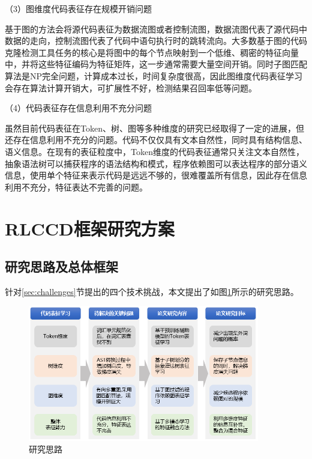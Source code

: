 （3）图维度代码表征存在规模开销问题

基于图的方法会将源代码表征为数据流图或者控制流图，数据流图代表了源代码中数据的走向，控制流图代表了代码中语句执行时的跳转流向。大多数基于图的代码克隆检测工具任务的核心是将图中的每个节点映射到一个低维、稠密的特征向量中，并将这些特征编码为特征矩阵，这一步通常需要大量空间开销。同时子图匹配算法是NP完全问题，计算成本过长，时间复杂度很高，因此图维度代码表征学习会存在算法计算开销大，可扩展性不好，检测结果召回率低等问题。

（4）代码表征存在信息利用不充分问题

虽然目前代码表征在Token、树、图等多种维度的研究已经取得了一定的进展，但还存在信息利用不充分的问题。代码不仅仅具有文本自然性，同时具有结构信息、语义信息。在现有的表征粒度中，Token维度的代码表征通常只关注文本自然性，抽象语法树可以捕获程序的语法结构和模式，程序依赖图可以表达程序的部分语义信息，使用单个特征来表示代码是远远不够的，很难覆盖所有信息，因此存在信息利用不充分，特征表达不完善的问题。

\section{RLCCD框架研究方案}
\label{sec:Framework}

\subsection{研究思路及总体框架}
\label{subsec:Ideas}
针对\ref{sec:challenges}节提出的四个技术挑战，本文提出了如图\ref{fig:thinking}所示的研究思路。

\begin{figure}
    \centering
    \includegraphics[width=0.9\textwidth]{figures/thinking}
    \caption{研究思路}\label{fig:thinking}
\end{figure}

